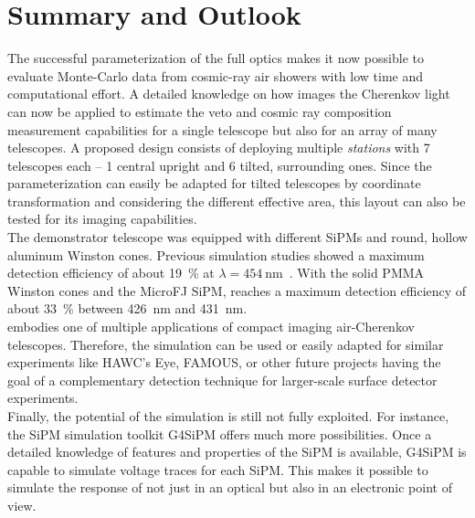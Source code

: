 \chapter{Summary and Outlook}

The successful parameterization of the full \iceact optics makes it now possible to evaluate Monte-Carlo data from cosmic-ray air showers with low time and computational effort. A detailed knowledge on how \iceact images the Cherenkov light can now be applied to estimate the veto and cosmic ray composition measurement capabilities for a single telescope but also for an array of many \iceact telescopes. A proposed design consists of deploying multiple \iceact \textit{stations} with 7 telescopes each -- 1 central upright and 6 tilted, surrounding ones. Since the parameterization can easily be adapted for tilted telescopes by coordinate transformation and considering the different effective area, this layout can also be tested for its imaging capabilities.\\

The \iceact demonstrator telescope was equipped with different SiPMs and round, hollow aluminum Winston cones. Previous simulation studies showed a maximum detection efficiency of about \SI{19}{\percent} at $\lambda = \SI{454}{\nano\meter}$~\cite{famous:niggemann}. With the solid PMMA Winston cones and the MicroFJ SiPM, \iceact reaches a maximum detection efficiency of about \SI{33}{\percent} between \SI{426}{\nano\meter} and \SI{431}{\nano\meter}.\\

\iceact embodies one of multiple applications of compact imaging air-Cherenkov telescopes. Therefore, the simulation can be used or easily adapted for similar experiments like HAWC's Eye, FAMOUS, or other future projects having the goal of a complementary detection technique for larger-scale surface detector experiments.\\

Finally, the potential of the \geant simulation is still not fully exploited. For instance, the SiPM simulation toolkit G4SiPM offers much more possibilities. Once a detailed knowledge of features and properties of the \iceact SiPM is available, G4SiPM is capable to simulate voltage traces for each SiPM. This makes it possible to simulate the response of \iceact not just in an optical but also in an electronic point of view.